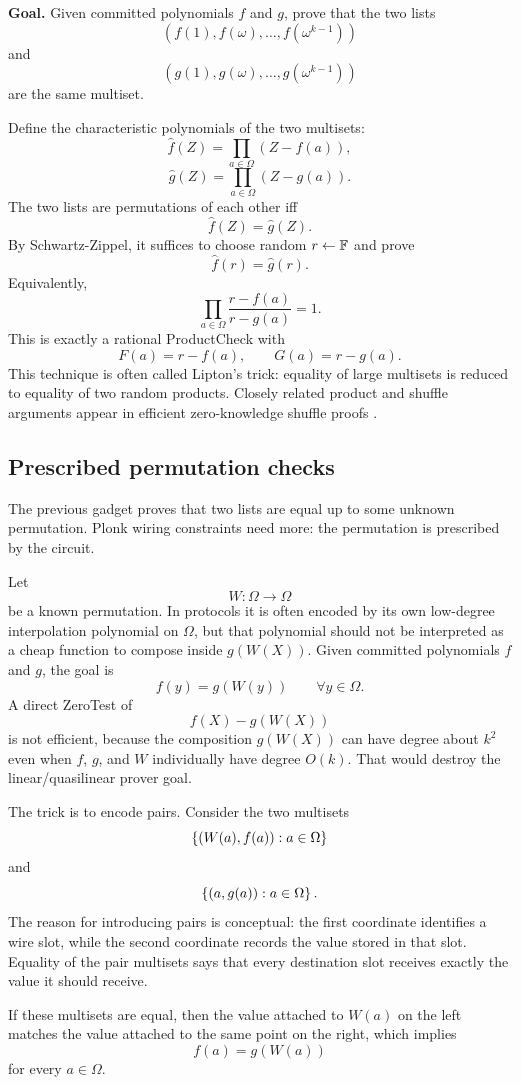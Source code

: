 \textbf{Goal.} Given committed polynomials $f$ and $g$, prove that the two lists
\[
    (f(1),f(\omega),\ldots,f(\omega^{k-1}))
\]
and
\[
    (g(1),g(\omega),\ldots,g(\omega^{k-1}))
\]
are the same multiset.

Define the characteristic polynomials of the two multisets:
\[
    \widehat f(Z)=\prod_{a\in\Omega}(Z-f(a)),
\]
\[
    \widehat g(Z)=\prod_{a\in\Omega}(Z-g(a)).
\]
The two lists are permutations of each other iff
\[
    \widehat f(Z)=\widehat g(Z).
\]
By Schwartz-Zippel, it suffices to choose random $r\leftarrow\mathbb{F}$ and prove
\[
    \widehat f(r)=\widehat g(r).
\]
Equivalently,
\[
    \prod_{a\in\Omega}\frac{r-f(a)}{r-g(a)}=1.
\]
This is exactly a rational ProductCheck with
\[
    F(a)=r-f(a),
    \qquad
    G(a)=r-g(a).
\]
This technique is often called Lipton's trick: equality of large multisets is reduced to equality of two random products. Closely related product and shuffle arguments appear in efficient zero-knowledge shuffle proofs \cite{BayerGroth2012}.

\subsection{Prescribed permutation checks}

The previous gadget proves that two lists are equal up to some unknown permutation. Plonk wiring constraints need more: the permutation is prescribed by the circuit.

Let
\[
    W:\Omega\to\Omega
\]
be a known permutation. In protocols it is often encoded by its own low-degree interpolation polynomial on $\Omega$, but that polynomial should not be interpreted as a cheap function to compose inside $g(W(X))$. Given committed polynomials $f$ and $g$, the goal is
\[
    f(y)=g(W(y))\qquad\forall y\in\Omega.
\]
A direct ZeroTest of
\[
    f(X)-g(W(X))
\]
is not efficient, because the composition $g(W(X))$ can have degree about $k^2$ even when $f$, $g$, and $W$ individually have degree $O(k)$. That would destroy the linear/quasilinear prover goal.

The trick is to encode pairs. Consider the two multisets
\[
    \left\{(W(a),f(a)):a\in\Omega\right\}
\]
and
\[
    \left\{(a,g(a)):a\in\Omega\right\}.
\]
The reason for introducing pairs is conceptual: the first coordinate identifies a wire slot, while the second coordinate records the value stored in that slot. Equality of the pair multisets says that every destination slot receives exactly the value it should receive.

If these multisets are equal, then the value attached to $W(a)$ on the left matches the value attached to the same point on the right, which implies
\[
    f(a)=g(W(a))
\]
for every $a\in\Omega$.


